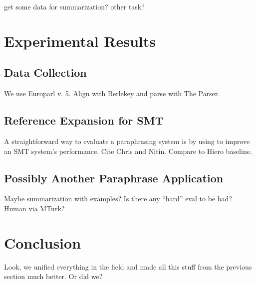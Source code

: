 \documentclass[11pt]{article}
\begin{document}
get some data for summarization? other task?

\section{Experimental Results} \label{results}


\subsection{Data Collection} \label{data_collection}

We use Europarl v. 5. Align with Berlekey and parse with The Parser.


\subsection{Reference Expansion for SMT} \label{smt_application}

A straightforward way to evaluate a paraphrasing system is by using to
improve an SMT system's performance. Cite Chris and Nitin. Compare to Hiero
baseline.  

\subsection{Possibly Another Paraphrase
  Application} \label{other_application}

Maybe summarization with examples? Is there any ``hard'' eval to be had? Human via MTurk?

\section{Conclusion} \label{conclusion}

Look, we unified everything in the field and made all this stuff from
the previous section much better. Or did we?




\nocite{*}
\end{document}
